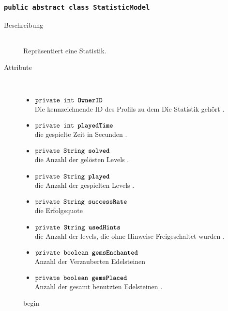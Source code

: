 
		\subsubsection{\normalfont \texttt{public abstract class \textbf{StatisticModel}}} 
		
		\begin{description}
		
		\item[Beschreibung] \hfill \\ Repräsentiert eine Statistik.
		\item[Attribute] \hfill \\
			\vspace{-.8cm}
			\begin{itemize}
				\item $\texttt{private int \textbf{OwnerID}}$ \\ Die kennzeichnende ID des Profils zu dem Die Statistik gehört .
				\item $\texttt{private int \textbf{playedTime}}$ \\ die gespielte Zeit in Secunden .
				\item $\texttt{private String \textbf{solved}}$ \\ die Anzahl der gelösten Levels .
				\item $\texttt{private String \textbf{played}}$ \\ die Anzahl der gespielten Levels .
				\item $\texttt{private String \textbf{successRate}}$ \\die Erfolgsquote
				\item $\texttt{private String \textbf{usedHints}}$ \\  die Anzahl der levels, die ohne Hinweise Freigeschaltet wurden .
				\item $\texttt{private boolean \textbf{gemsEnchanted}}$ \\ Anzahl der Verzauberten Edelsteinen 
				\item $\texttt{private boolean \textbf{gemsPlaced}}$ \\ Anzahl der gesamt benutzten Edelsteinen .
			\end{itemize}
			
		begin
			

\end{description}

